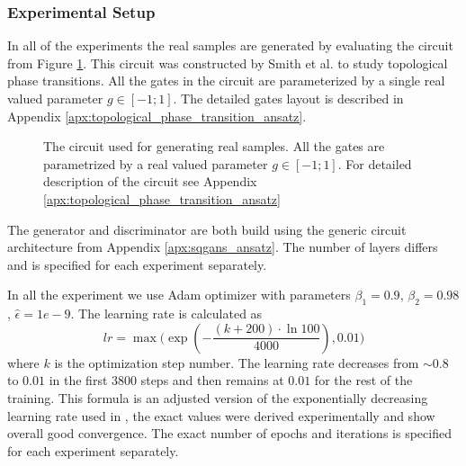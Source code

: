 \subsubsection{Experimental Setup}
In all of the experiments the real samples are generated by evaluating the
circuit from Figure \ref{fig:phase_circuit_small}. This circuit was constructed
by Smith et al. \cite{smith2020crossing} to study topological phase transitions.
All the gates in the circuit are parameterized by a single real valued parameter
$g \in [-1;1]$. The detailed gates layout is described in Appendix \ref{apx:topological_phase_transition_ansatz}.
\begin{figure}[htbp!]
  \caption{The circuit used for generating real samples. All the gates are
    parametrized by a real valued parameter $g \in [-1; 1]$. For detailed
    description of the circuit see Appendix
    \ref{apx:topological_phase_transition_ansatz} \label{fig:phase_circuit_small}}
\end{figure}

The generator and discriminator are both build using the generic circuit
architecture from Appendix \ref{apx:sqgans_ansatz}. The number of layers differs
and is specified for each experiment separately.

In all the experiment we use Adam optimizer \cite{kingma2017adam} with
parameters $\beta_1 = 0.9$, $\beta_2=0.98$, $\hat{\epsilon} = 1e-9$. The
learning rate is calculated as
\begin{equation}
lr = \max{(\exp{(-\frac{(k+200) \cdot \ln{100}}{4000}), 0.01)}}
\end{equation}
where $k$ is the optimization step number. The
learning rate decreases from $\sim 0.8$ to $0.01$ in the first $3800$ steps and then
remains at $0.01$ for the rest of the training. This formula is an adjusted
version of the exponentially decreasing learning rate used in
\cite{Dallaire_Demers_2018}, the exact values were derived
experimentally and show overall good convergence. The exact number of epochs and
iterations is specified for each experiment separately.
